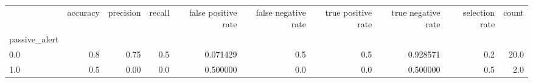 \begin{tabular}{lrrrrrrrrr}
\toprule
{} &  accuracy &  precision &  recall &  false positive rate &  false negative rate &  true positive rate &  true negative rate &  selection rate &  count \\
passive\_alert &           &            &         &                      &                      &                     &                     &                 &        \\
\midrule
0.0           &       0.8 &       0.75 &     0.5 &             0.071429 &                  0.5 &                 0.5 &            0.928571 &             0.2 &   20.0 \\
1.0           &       0.5 &       0.00 &     0.0 &             0.500000 &                  0.0 &                 0.0 &            0.500000 &             0.5 &    2.0 \\
\bottomrule
\end{tabular}
